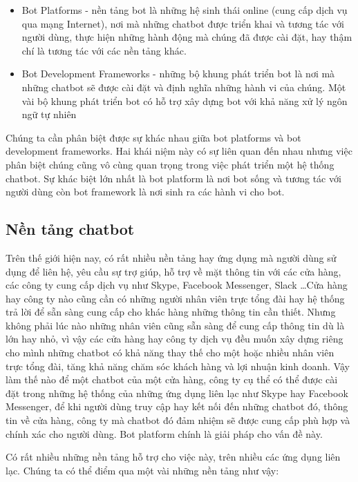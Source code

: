 \documentclass[12pt]{report}
\begin{document}
\begin{itemize}
	\item Bot Platforms - nền tảng bot là những hệ sinh thái online (cung cấp dịch vụ qua mạng Internet), nơi mà những chatbot được triển khai và tương tác với người dùng, thực hiện những hành động mà chúng đã được cài đặt, hay thậm chí là tương tác với các nền tảng khác.
	\item Bot Development Frameworks - những bộ khung phát triển bot là nơi mà những chatbot sẽ được cài đặt và định nghĩa những hành vi của chúng. Một vài bộ khung phát triển bot có hỗ trợ xây dựng bot với khả năng xử lý ngôn ngữ tự nhiên
\end{itemize}

Chúng ta cần phân biệt được sự khác nhau giữa bot platforms và bot development frameworks. Hai khái niệm này có sự liên quan đến nhau nhưng việc phân biệt chúng cũng vô cùng quan trọng trong việc phát triển một hệ thống chatbot. Sự khác biệt lớn nhất là bot platform là nơi bot sống và tương tác với người dùng còn bot framework là nơi sinh ra các hành vi cho bot.

\subsection{Nền tảng chatbot}

Trên thế giới hiện nay, có rất nhiều nền tảng hay ứng dụng mà người dùng sử dụng để liên hệ, yêu cầu sự trợ giúp, hỗ trợ về mặt thông tin với các cửa hàng, các công ty cung cấp dịch vụ như Skype, Facebook Messenger, Slack \ldots Cửa hàng hay công ty nào cũng cần có những người nhân viên trực tổng đài hay hệ thống trả lời để sẵn sàng cung cấp cho khác hàng những thông tin cần thiết. Nhưng không phải lúc nào những nhân viên cũng sẵn sàng để cung cấp thông tin dù là lớn hay nhỏ, vì vậy các cửa hàng hay công ty dịch vụ đều muốn xây dựng riêng cho mình những chatbot có khả năng thay thế cho một hoặc nhiều nhân viên trực tổng đài, tăng khả năng chăm sóc khách hàng và lợi nhuận kinh doanh. Vậy làm thế nào để một chatbot của một cửa hàng, công ty cụ thể có thể được cài đặt trong những hệ thống của những ứng dụng liên lạc như Skype hay Facebook Messenger, để khi người dùng truy cập hay kết nối đến những chatbot đó, thông tin về cửa hàng, công ty mà chatbot đó đảm nhiệm sẽ được cung cấp phù hợp và chính xác cho người dùng. Bot platform chính là giải pháp cho vấn đề này.

Có rất nhiều những nền tảng hỗ trợ cho việc này, trên nhiều các ứng dụng liên lạc. Chúng ta có thể điểm qua một vài những nền tảng như vậy:
\end{document}
